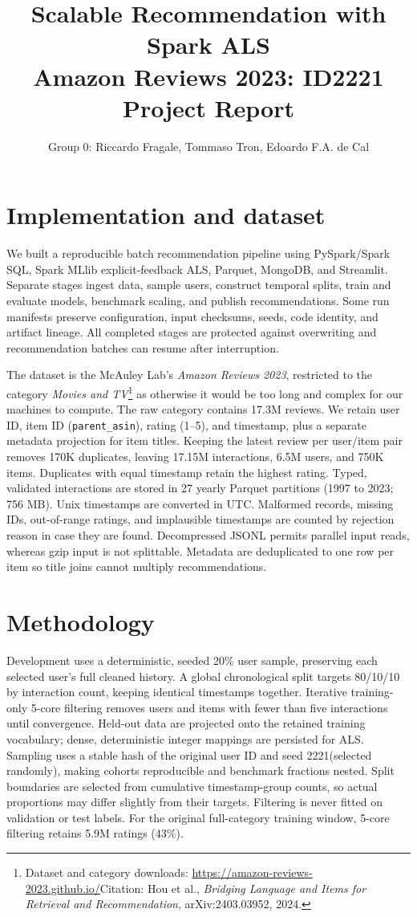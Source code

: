 \documentclass[10pt,a4paper]{article}
\title{\vspace{-13mm}Scalable Recommendation with Spark ALS\\
  \large Amazon Reviews 2023: ID2221 Project Report}
\author{Group 0: Riccardo Fragale, Tommaso Tron, Edoardo F.A. de Cal}
\date{}
\begin{document}
\maketitle
\vspace{-9mm}

\section*{Implementation and dataset}
We built a reproducible batch recommendation pipeline using PySpark/Spark SQL,
Spark MLlib explicit-feedback ALS, Parquet, MongoDB, and Streamlit. Separate
stages ingest data, sample users, construct temporal splits, train and evaluate
models, benchmark scaling, and publish recommendations. Some run manifests preserve
configuration, input checksums, seeds, code identity, and artifact lineage.
All completed stages are protected against overwriting and recommendation batches can
resume after interruption.

The dataset is the McAuley Lab's \emph{Amazon Reviews 2023}, restricted to the category
\emph{Movies and TV}\footnote{Dataset and category downloads:
\url{https://amazon-reviews-2023.github.io/}Citation: Hou et al.,
\emph{Bridging Language and Items for Retrieval and Recommendation}, arXiv:2403.03952, 2024.}
as otherwise it would be too long and complex for our machines to compute.
The raw category contains 17.3M reviews. We retain user ID, item ID
(\texttt{parent\_asin}), rating (1--5), and timestamp, plus a separate metadata
projection for item titles. Keeping the latest review per user/item pair removes
170K duplicates, leaving 17.15M interactions, 6.5M users, and 750K
items. Duplicates with equal timestamp retain the highest rating. Typed, validated
interactions are stored in 27 yearly Parquet partitions (1997 to 2023; 756 MB).
Unix timestamps are converted in UTC. Malformed records, missing IDs,
out-of-range ratings, and implausible timestamps are counted by rejection reason in case they are found.
Decompressed JSONL permits
parallel input reads, whereas gzip input is not splittable. Metadata are
deduplicated to one row per item so title joins cannot multiply recommendations.

\section*{Methodology}
Development uses a deterministic, seeded 20\% user sample, preserving each selected
user's full cleaned history. A global chronological split targets 80/10/10 by
interaction count, keeping identical timestamps together. Iterative training-only
5-core filtering removes users and items with fewer than five interactions until
convergence. Held-out data are projected onto the retained training vocabulary;
dense, deterministic integer mappings are persisted for ALS.
Sampling uses a stable hash of the original user ID and seed 2221(selected randomly), making cohorts
reproducible and benchmark fractions nested. Split boundaries are selected from
cumulative timestamp-group counts, so actual proportions may differ slightly
from their targets. Filtering is never fitted on validation or test labels.
For the original full-category training window, 5-core filtering retains
5.9M ratings (43\%).
\end{document}
